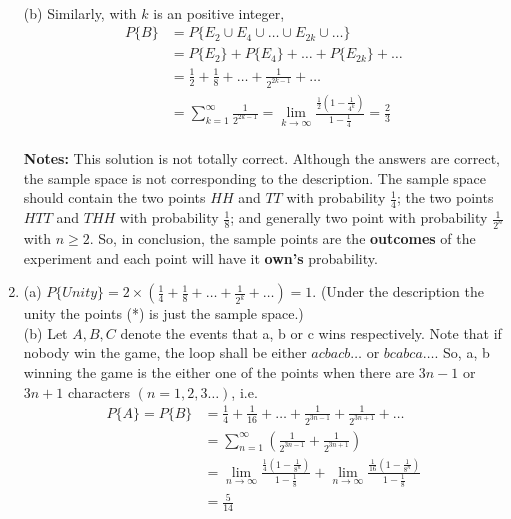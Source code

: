 \documentclass{article}
\numberwithin{equation}{subsection}
\begin{document}
\begin{enumerate}
			\\(b) Similarly, with $k$ is an positive integer,
			\begin{equation}
				\begin{aligned}
					P\{B\} &= P\{E_2 \cup E_4 \cup \dots \cup E_{2k} \cup \dots\} \\
					&= P\{E_2\} + P\{E_4\} + \dots + P\{E_{2k}\} + \dots \\
					&= \frac{1}{2} + \frac{1}{8} + \dots + \frac{1}{2^{2k-1}} + \dots \\
					&=\sum_{k=1}^{\infty}\frac{1}{2^{2k-1}} = \lim_{k \to \infty}\frac{\frac{1}{2}\left(1-\frac{1}{4^k}\right)}{1-\frac{1}{4}} = \frac{2}{3}
				\end{aligned}
			\end{equation}
			\\ \textbf{Notes:} This solution is not totally correct. Although the answers are correct, the sample space is not corresponding to the description. The sample space should contain the two points $HH$ and $TT$ with probability $\frac{1}{4}$; the two points $HTT$ and $THH$ with probability $\frac{1}{8}$; and generally two point with probability $\frac{1}{2^n}$ with $n\geq2$. So, in conclusion, the sample points are the \textbf{outcomes} of the experiment and each point will have it \textbf{own's} probability.
			\item (a) $P\{Unity\} = 2\times(\frac{1}{4} + \frac{1}{8} + \dots + \frac{1}{2^k} + \dots) = 1.$ (Under the description the unity the points (*) is just the sample space.) \\ (b) Let $A,B,C$ denote the events that a, b or c wins respectively. Note that if nobody win the game, the loop shall be either $acbacb\dots$ or $bcabca\dots$. So, a, b winning the game is the either one of the points when there are $3n-1$ or $3n+1$ characters $(n = 1,2,3\dots)$, i.e.
			\begin{equation}
				\begin{aligned}
					P\{A\} = P\{B\} &= \frac{1}{4} + \frac{1}{16} + \dots + \frac{1}{2^{3n-1}} + \frac{1}{2^{3n+1}} + \dots \\ &= \sum_{n=1}^{\infty}\left(\frac{1}{2^{3n-1}}+\frac{1}{2^{3n+1}}\right)\\ &= \lim_{n \to \infty}\frac{\frac{1}{4}\left(1-\frac{1}{8^n}\right)}{1-\frac{1}{8}}+\lim_{n \to \infty}\frac{\frac{1}{16}\left(1-\frac{1}{8^n}\right)}{1-\frac{1}{8}}\\ &= \frac{5}{14}
				\end{aligned}
			\end{equation}

\end{enumerate}
\end{document}
